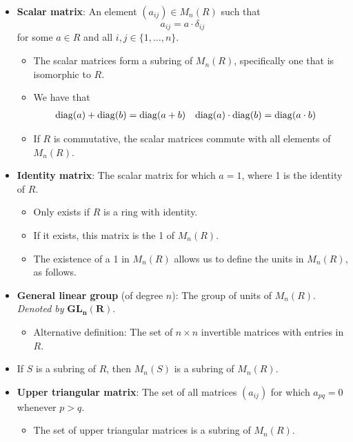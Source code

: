\documentclass[../notes.tex]{subfiles}
\begin{document}
\begin{itemize}
\begin{itemize}
    \end{itemize}
    \item \textbf{Scalar matrix}: An element $(a_{ij})\in M_n(R)$ such that
    \begin{equation*}
        a_{ij} = a\cdot\delta_{ij}
    \end{equation*}
    for some $a\in R$ and all $i,j\in\{1,\dots,n\}$.
    \begin{itemize}
        \item The scalar matrices form a subring of $M_n(R)$, specifically one that is isomorphic to $R$.
        \item We have that
        \begin{align*}
            \operatorname{diag}(a)+\operatorname{diag}(b) &= \operatorname{diag}(a+b)&
            \operatorname{diag}(a)\cdot\operatorname{diag}(b) &= \operatorname{diag}(a\cdot b)
        \end{align*}
        \item If $R$ is commutative, the scalar matrices commute with all elements of $M_n(R)$.
    \end{itemize}
    \item \textbf{Identity matrix}: The scalar matrix for which $a=1$, where 1 is the identity of $R$.
    \begin{itemize}
        \item Only exists if $R$ is a ring with identity.
        \item If it exists, this matrix is the 1 of $M_n(R)$.
        \item The existence of a 1 in $M_n(R)$ allows us to define the units in $M_n(R)$, as follows.
    \end{itemize}
    \item \textbf{General linear group} (of degree $n$): The group of units of $M_n(R)$. \emph{Denoted by} $\bm{GL_n(R)}$.
    \begin{itemize}
        \item Alternative definition: The set of $n\times n$ invertible matrices with entries in $R$.
    \end{itemize}
    \item If $S$ is a subring of $R$, then $M_n(S)$ is a subring of $M_n(R)$.
    \item \textbf{Upper triangular matrix}: The set of all matrices $(a_{ij})$ for which $a_{pq}=0$ whenever $p>q$.
    \begin{itemize}
        \item The set of upper triangular matrices is a subring of $M_n(R)$.
    \end{itemize}

\end{itemize}
\end{document}

